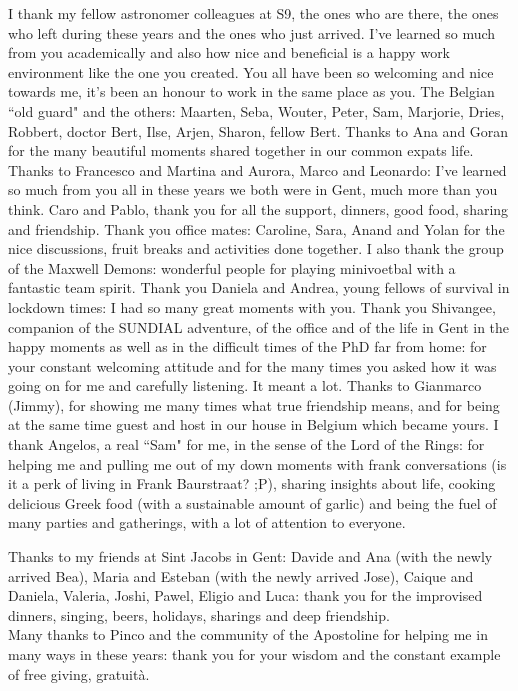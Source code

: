 {I thank my fellow astronomer colleagues at S9, the ones who are there, the ones who left during these years and the ones who just arrived.
I've learned so much from you academically and also how nice and beneficial is a happy work environment like the one you created.
You all have been so welcoming and nice towards me, it's been an honour to work in the same place as you.
The Belgian ``old guard" and the others: Maarten, Seba, Wouter, Peter, Sam, Marjorie, Dries, Robbert, doctor Bert, Ilse, Arjen, Sharon, fellow Bert.
Thanks to Ana and Goran for the many beautiful moments shared together in our common expats life.
Thanks to Francesco and Martina and Aurora, Marco and Leonardo: I've learned so much from you all in these years we both were in Gent, much more than you think.
Caro and Pablo, thank you for all the support, dinners, good food, sharing and friendship.
Thank you office mates: Caroline, Sara, Anand and Yolan for the nice discussions, fruit breaks and activities done together.
I also thank the group of the Maxwell Demons: wonderful people for playing minivoetbal with a fantastic team spirit.
Thank you Daniela and Andrea, young fellows of survival in lockdown times: I had so many great moments with you.
Thank you Shivangee, companion of the SUNDIAL adventure, of the office and of the life in Gent in the happy moments as well as in the difficult times of the PhD far from home: for your constant welcoming attitude and for the many times you asked how it was going on for me and carefully listening. It meant a lot.
Thanks to Gianmarco (Jimmy), for showing me many times what true friendship means, and for being at the same time guest and host in our house in Belgium which became yours.
I thank Angelos, a real ``Sam" for me, in the sense of the Lord of the Rings: for helping me %
and pulling me out of my down moments with frank conversations (is it a perk of living in Frank Baurstraat? ;P), sharing insights about life, cooking delicious Greek food (with a sustainable amount of garlic) and being the fuel of many parties and gatherings, with a lot of attention to everyone.

Thanks to my friends at Sint Jacobs in Gent: Davide and Ana (with the newly arrived Bea), Maria and Esteban (with the newly arrived Jose), Caique and Daniela, Valeria, Joshi, Pawel, Eligio and Luca: thank you for the improvised dinners, singing, beers, holidays, sharings and deep friendship.\\
Many thanks to Pinco and the community of the Apostoline for helping me in many ways in these years: thank you for your wisdom and the constant example of free giving, gratuità.

}
